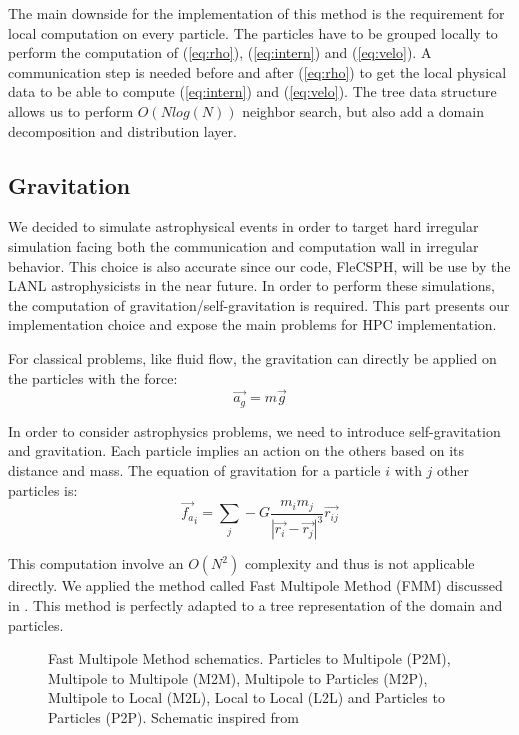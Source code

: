 The main downside for the implementation of this method is the requirement for local computation on every particle. 
The particles have to be grouped locally to perform the computation of (\ref{eq:rho}), (\ref{eq:intern}) and (\ref{eq:velo}).
A communication step is needed before and after (\ref{eq:rho}) to get the local physical data to be able to compute (\ref{eq:intern}) and (\ref{eq:velo}).
The tree data structure allows us to perform $O(Nlog(N))$ neighbor search, but also add a domain decomposition and distribution layer.

\subsection{Gravitation}
We decided to simulate astrophysical events in order to target hard irregular simulation facing both the communication and computation wall in irregular behavior. 
This choice is also accurate since our code, FleCSPH, will be use by the LANL astrophysicists in the near future. 
In order to perform these simulations, the computation of gravitation/self-gravitation is required. 
This part presents our implementation choice and expose the main problems for HPC implementation. 


For classical problems, like fluid flow, the gravitation can directly be applied on the particles with the force:
\begin{equation}
	\vec{a_g} = m\vec{g}
\end{equation}

In order to consider astrophysics problems, we need to introduce self-gravitation and gravitation. 
Each particle implies an action on the others based on its distance and mass. 
The equation of gravitation for a particle $i$ with $j$ other particles is: 
\begin{equation}
	\vec{f_a}_i = \sum_j -G \frac{m_i m_j}{|\vec{r_i}-\vec{r_j}|^3} \vec{r_{ij}}
	\label{eq:gravitation}
\end{equation}

This computation involve an $O(N^2)$ complexity and thus is not applicable directly. 
We applied the method called Fast Multipole Method (FMM) discussed in \cite{beatson1997short}.
This method is perfectly adapted to a tree representation of the domain and particles. 

\begin{figure}[ht!]

\caption[Highlights of the Fast Multipole Method]{Fast Multipole Method schematics. Particles to Multipole (P2M), Multipole to Multipole (M2M), Multipole to Particles (M2P), Multipole to Local (M2L), Local to Local (L2L) and Particles to Particles (P2P). Schematic inspired from \cite{yokota2011treecode}}
\label{fig:gravitation_fmm}
\end{figure}


